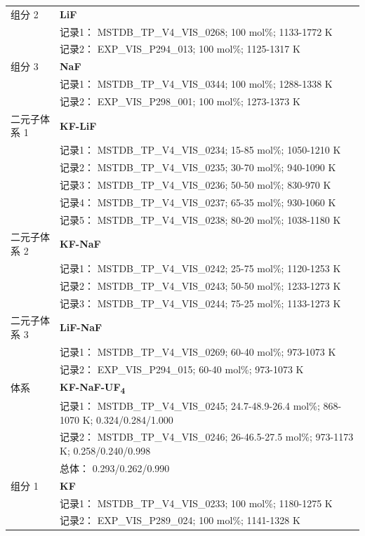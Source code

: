 \documentclass[12pt]{article}
\begin{document}
{\begin{longtable}[]{@{}
  >{\raggedright\arraybackslash}p{}
  >{\raggedright\arraybackslash}p{}@{}}
组分 2  & \textbf{LiF} \\
 & 记录1： MSTDB\_TP\_V4\_VIS\_0268; 100 mol\%; 1133-1772 K \\
 & 记录2： EXP\_VIS\_P294\_013; 100 mol\%; 1125-1317 K  \\

组分 3  & \textbf{NaF} \\
 & 记录1： MSTDB\_TP\_V4\_VIS\_0344; 100 mol\%; 1288-1338 K \\
 & 记录2： EXP\_VIS\_P298\_001; 100 mol\%; 1273-1373 K  \\

二元子体系 1  & \textbf{KF-LiF} \\
 & 记录1： MSTDB\_TP\_V4\_VIS\_0234; 15-85 mol\%; 1050-1210 K \\
 & 记录2： MSTDB\_TP\_V4\_VIS\_0235; 30-70 mol\%; 940-1090 K \\
 & 记录3： MSTDB\_TP\_V4\_VIS\_0236; 50-50 mol\%; 830-970 K \\
 & 记录4： MSTDB\_TP\_V4\_VIS\_0237; 65-35 mol\%; 930-1060 K \\
 & 记录5： MSTDB\_TP\_V4\_VIS\_0238; 80-20 mol\%; 1038-1180 K  \\

二元子体系 2  & \textbf{KF-NaF} \\
 & 记录1： MSTDB\_TP\_V4\_VIS\_0242; 25-75 mol\%; 1120-1253 K \\
 & 记录2： MSTDB\_TP\_V4\_VIS\_0243; 50-50 mol\%; 1233-1273 K \\
 & 记录3： MSTDB\_TP\_V4\_VIS\_0244; 75-25 mol\%; 1133-1273 K  \\

二元子体系 3  & \textbf{LiF-NaF} \\
 & 记录1： MSTDB\_TP\_V4\_VIS\_0269; 60-40 mol\%; 973-1073 K \\
 & 记录2： EXP\_VIS\_P294\_015; 60-40 mol\%; 973-1073 K  \\

\midrule
体系 & \textbf{KF-NaF-UF\textsubscript{4}} \\
 & 记录1： MSTDB\_TP\_V4\_VIS\_0245; 24.7-48.9-26.4 mol\%; 868-1070 K; 0.324/0.284/1.000 \\
 & 记录2： MSTDB\_TP\_V4\_VIS\_0246; 26-46.5-27.5 mol\%; 973-1173 K; 0.258/0.240/0.998 \\
 & 总体： 0.293/0.262/0.990  \\

组分 1  & \textbf{KF} \\
 & 记录1： MSTDB\_TP\_V4\_VIS\_0233; 100 mol\%; 1180-1275 K \\
 & 记录2： EXP\_VIS\_P289\_024; 100 mol\%; 1141-1328 K  \\


\end{longtable}}
\end{document}

